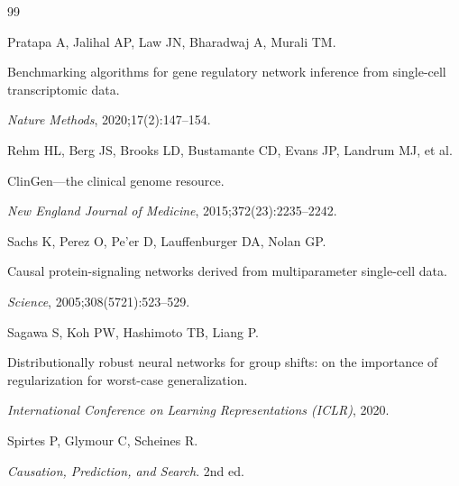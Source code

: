 \documentclass[12pt,a4paper]{article}
\begin{document}
\begin{thebibliography}{99}

Pratapa A, Jalihal AP, Law JN, Bharadwaj A, Murali TM.




Benchmarking algorithms for gene regulatory network inference from single-cell transcriptomic data.




\textit{Nature Methods}, 2020;17(2):147--154.




Rehm HL, Berg JS, Brooks LD, Bustamante CD, Evans JP, Landrum MJ, et al.




ClinGen---the clinical genome resource.




\textit{New England Journal of Medicine}, 2015;372(23):2235--2242.




Sachs K, Perez O, Pe'er D, Lauffenburger DA, Nolan GP.




Causal protein-signaling networks derived from multiparameter single-cell data.




\textit{Science}, 2005;308(5721):523--529.




Sagawa S, Koh PW, Hashimoto TB, Liang P.




Distributionally robust neural networks for group shifts: on the importance of regularization for worst-case generalization.




\textit{International Conference on Learning Representations (ICLR)}, 2020.













Spirtes P, Glymour C, Scheines R.



\textit{Causation, Prediction, and Search}. 2nd ed.




\end{thebibliography}
\end{document}
